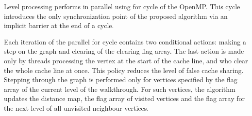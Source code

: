 \documentclass[letterpaper]{article}
\begin{document}
			Level processing performs in parallel using for cycle of the OpenMP.
			This cycle introduces the only synchronization point of the proposed algorithm via an implicit barrier at the end of a cycle.
			
			Each iteration of the parallel for cycle contains two conditional actions: making a step on the graph and clearing of the clearing flag array.
			The last action is made only by threads processing the vertex at the start of the cache line, and who clear the whole cache line at once.
			This policy reduces the level of false cache sharing. 
			Stepping through the graph is performed only for vertices specified by the flag array of the current level of the walkthrough.
			For such vertices, the algorithm updates the distance map, the flag array of visited vertices and the flag array for the next level of all unvisited neighbour vertices.
						
\end{document}
